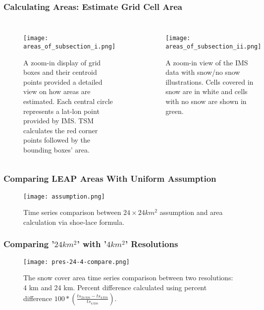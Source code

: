\begin{frame}
\frametitle{Calculating Areas: Estimate Grid Cell Area}
\begin{columns}
\begin{figure}
\centering
\begin{minipage}{1\columnwidth}
\texttt{[image: areas\_of\_subsection\_i.png]}
\caption{A zoom-in display of grid boxes and their centroid points provided a detailed view on how areas are estimated. Each central circle represents a lat-lon point provided by IMS. TSM calculates the red corner points followed by the bounding boxes' area.}
\end{minipage}
\end{figure}
\begin{figure}
\centering
\begin{minipage}{1\columnwidth}
\texttt{[image: areas\_of\_subsection\_ii.png]}
\caption{A zoom-in view of the IMS data with snow/no snow illustrations. Cells covered in snow are in white and cells with no snow are shown in green.}
\end{minipage}
\end{figure}
\end{columns}
\end{frame}

\begin{frame}
\frametitle{Comparing LEAP Areas With Uniform Assumption}
\begin{figure}
\vspace*{-.5cm}
\centering
\begin{minipage}{.7\columnwidth}
\texttt{[image: assumption.png]}
\caption{Time series comparison between $24\times 24 km^{2}$ assumption and area calculation via shoe-lace formula.}
\end{minipage}
\end{figure}
\end{frame}

\begin{frame}
\frametitle{Comparing '$24km^{2}$' with  '$4km^{2}$' Resolutions}
\begin{figure}
\vspace*{-.5cm}
\centering
\begin{minipage}{.7\columnwidth}
\texttt{[image: pres-24-4-compare.png]}
\caption{The snow cover area time series comparison between two resolutions: 4 km and 24 km. Percent difference calculated using percent difference $100 * \left( \frac{ts_{24\ km} - ts_{4\ km}}{ts_{4\ km}} \right)$.}
\end{minipage}
\end{figure}
\end{frame}

